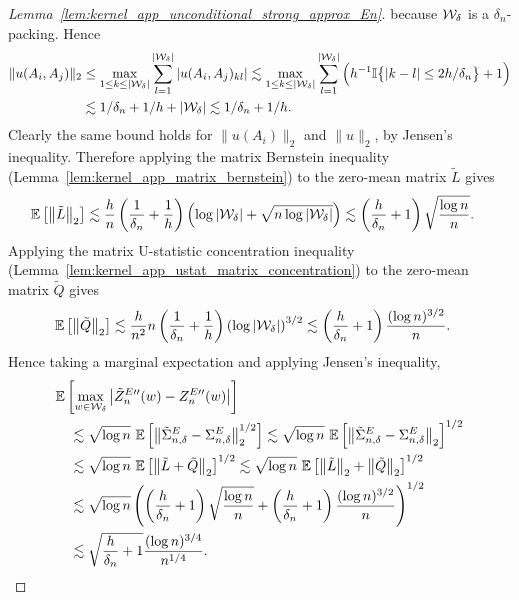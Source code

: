 \begin{proof}[Lemma~\ref{lem:kernel_app_unconditional_strong_approx_En}]
  because $\mathcal{W}_\delta$
  is a $\delta_n$-packing.
  Hence
  \begin{align*}
    \|u(A_i, A_j)\|_2
    &\leq
    \max_{1 \leq k \leq |\mathcal{W}_\delta|}
    \sum_{l=1}^{|\mathcal{W}_\delta|}
    |u(A_i, A_j)_{kl}|
    \lesssim
    \max_{1 \leq k \leq |\mathcal{W}_\delta|}
    \sum_{l=1}^{|\mathcal{W}_\delta|}
    \Big(
      h^{-1}
      \mathbb{I}\big\{ |k-l| \leq 2h/\delta_n \big\}
      + 1
    \Big) \\
    &\lesssim
    1/\delta_n
    + 1/h
    + |\mathcal{W}_\delta|
    \lesssim
    1/\delta_n
    + 1/h.
  \end{align*}
  Clearly the same bound holds for
  $\|u(A_i)\|_2$ and $\|u\|_2$, by Jensen's inequality.
  Therefore applying the matrix Bernstein inequality
  (Lemma~\ref{lem:kernel_app_matrix_bernstein})
  to the zero-mean matrix $\tilde L$ gives
  \begin{align*}
    \mathbb{E}\left[
      \left\|
      \tilde L
      \right\|_2
    \right]
    &\lesssim
    \frac{h}{n}
    \left(\frac{1}{\delta_n} + \frac{1}{h} \right)
    \left(
      \log |\mathcal{W}_\delta| + \sqrt{n \log |\mathcal{W}_\delta|}
    \right)
    \lesssim
    \left(\frac{h}{\delta_n} + 1 \right)
    \sqrt{\frac{\log n}{n}}.
  \end{align*}
  Applying the matrix U-statistic concentration inequality
  (Lemma~\ref{lem:kernel_app_ustat_matrix_concentration})
  to the zero-mean matrix $\tilde Q$ gives
  \begin{align*}
    \mathbb{E}\left[
      \big\|
      \tilde Q
      \big\|_2
    \right]
    &\lesssim
    \frac{h}{n^2}
    n
    \left(\frac{1}{\delta_n} + \frac{1}{h} \right)
    \left(
      \log |\mathcal{W}_\delta|
    \right)^{3/2}
    \lesssim
    \left(\frac{h}{\delta_n} + 1 \right)
    \frac{(\log n)^{3/2}}{n}.
  \end{align*}
  Hence taking a marginal expectation
  and applying Jensen's inequality,
  \begin{align*}
    &\mathbb{E}\left[
      \max_{w \in \mathcal{W}_\delta}
      \big|\tilde Z_n^{E\prime\prime}(w) - Z_n^{E\prime\prime}(w)\big|
    \right] \\
    &\quad\lesssim
    \sqrt{\log n} \
    \mathbb{E}\left[
      \left\|
      \tilde\Sigma^E_{n,\delta} - \Sigma^E_{n,\delta}
      \right\|_2^{1/2}
    \right]
    \lesssim
    \sqrt{\log n} \
    \mathbb{E}\left[
      \left\|
      \tilde\Sigma^E_{n,\delta} - \Sigma^E_{n,\delta}
      \right\|_2
    \right]^{1/2} \\
    &\quad\lesssim
    \sqrt{\log n} \
    \mathbb{E}\left[
      \left\|
      \tilde L
      + \tilde Q
      \right\|_2
    \right]^{1/2}
    \lesssim
    \sqrt{\log n} \
    \mathbb{E}\left[
      \left\|
      \tilde L
      \right\|_2
      + \left\|
      \tilde Q
      \right\|_2
    \right]^{1/2} \\
    &\quad\lesssim
    \sqrt{\log n}
    \left(
      \left(\frac{h}{\delta_n} + 1 \right)
      \sqrt{\frac{\log n}{n}}
      + \left(\frac{h}{\delta_n} + 1 \right)
      \frac{(\log n)^{3/2}}{n}
    \right)^{1/2} \\
    &\quad\lesssim
    \sqrt{\frac{h}{\delta_n} + 1}
    \frac{(\log n)^{3/4}}{n^{1/4}}.
  \end{align*}


\end{proof}
